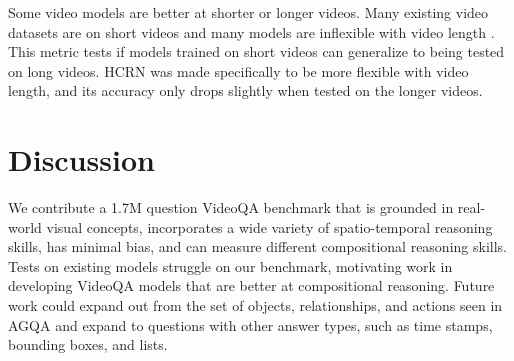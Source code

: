 \documentclass[10pt,twocolumn,letterpaper]{article}
\begin{document}
Some video models are better at shorter or longer videos. Many existing video datasets are on short videos and many models are inflexible with video length \cite{le2020hierarchical}. This metric tests if models trained on short videos can generalize to being tested on long videos. HCRN was made specifically to be more flexible with video length, and its accuracy only drops slightly when tested on the longer videos.


\section{Discussion}

We contribute a 1.7M question VideoQA benchmark that is grounded in real-world visual concepts, incorporates a wide variety of spatio-temporal reasoning skills, has minimal bias, and can measure different compositional reasoning skills. Tests on existing models struggle on our benchmark, motivating work in developing VideoQA models that are better at compositional reasoning. Future work could expand out from the set of objects, relationships, and actions seen in AGQA and expand to questions with other answer types, such as time stamps, bounding boxes, and lists.

{\small


}
\end{document}
